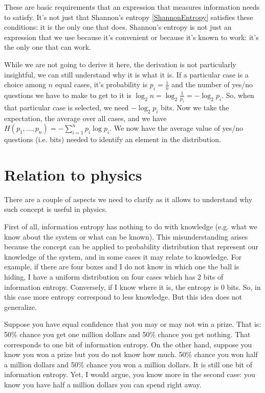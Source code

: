 \documentclass[aps,pra,10pt,floatfix,nofootinbib]{revtex4-1}
\theoremstyle{definition}
\begin{document}
These are basic requirements that an expression that measures information needs to satisfy. It's not just that Shannon's entropy \eqref{ShannonEntropy} satisfies these conditions: it is the only one that does. Shannon's entropy is not just an expression that we use because it's convenient or because it's known to work: it's the only one that can work.

While we are not going to derive it here, the derivation is not particularly insightful, we can still understand why it is what it is. If a particular case is a choice among $n$ equal cases, it's probability is $p_i=\frac{1}{n}$ and the number of yes/no questions we have to make to get to it is $\log_2 n = \log_2 \frac{1}{p_i} = - \log_2 p_i$. So, when that particular case is selected, we need $- \log_2 p_i$ bits. Now we take the expectation, the average over all cases, and we have $H(p_1, ..., p_n) = - \sum_{i=1}^{n} p_i \log p_i$. We now have the average value of yes/no questions (i.e. bits) needed to identify an element in the distribution.

\section{Relation to physics}

There are a couple of aspects we need to clarify as it allows to understand why such concept is useful in physics.

First of all, information entropy has nothing to do with knowledge (e.g. what we know about the system or what can be known). This misunderstanding arises because the concept can be applied to probability distribution that represent our knowledge of the system, and in some cases it may relate to knowledge. For example, if there are four boxes and I do not know in which one the ball is hiding, I have a uniform distribution on four cases which has 2 bits of information entropy. Conversely, if I know where it is, the entropy is 0 bits. So, in this case more entropy correspond to less knowledge. But this idea does not generalize.

Suppose you have equal confidence that you may or may not win a prize. That is: 50\% chance you get one million dollars and 50\% chance you get nothing. That corresponds to one bit of information entropy. On the other hand, suppose you know you won a prize but you do not know how much. 50\% chance you won half a million dollars and 50\% chance you won a million dollars. It is still one bit of information entropy. Yet, I would argue, you know more in the second case: you know you have half a million dollars you can spend right away.
\end{document}
